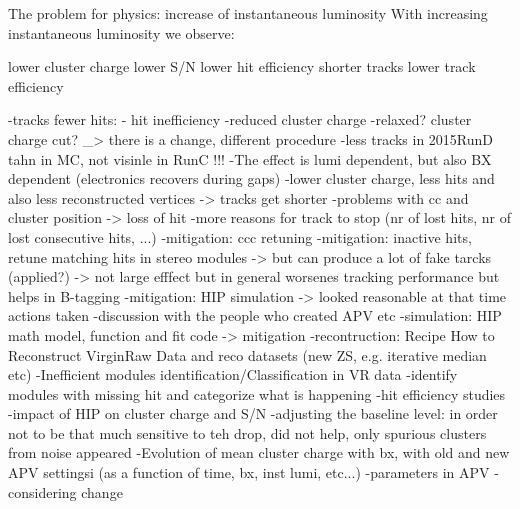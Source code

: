 The problem for physics:
increase of instantaneous luminosity
 With increasing instantaneous luminosity we observe:

    lower cluster charge
    lower S/N
    lower hit efficiency
    shorter tracks
    lower track efficiency 

-tracks fewer hits:
- hit inefficiency
-reduced cluster charge
-relaxed? cluster charge cut? _> there is a change, different procedure
-less tracks in  2015RunD tahn in MC, not visinle in RunC  !!!
-The effect is lumi dependent, but also BX dependent (electronics recovers during gaps)
-lower cluster charge, less hits and also less reconstructed vertices -> tracks get shorter
-problems with cc and cluster position -> loss of hit
-more reasons for track to stop (nr of lost hits, nr of lost consecutive hits, ...)
-mitigation: ccc retuning
-mitigation: inactive hits, retune matching hits in stereo modules -> but can produce a lot of fake tarcks (applied?) -> not large efffect but in general worsenes tracking performance but helps in B-tagging
-mitigation: HIP simulation -> looked reasonable at that time
actions taken
-discussion with the people who created APV etc
-simulation: HIP math model, function and fit code -> mitigation
-recontruction: Recipe How to Reconstruct VirginRaw Data and reco datasets (new ZS, e.g. iterative median etc)
-Inefficient modules identification/Classification in VR data -identify modules with missing hit and categorize what is happening
-hit efficiency studies
-impact of HIP on cluster charge and S/N 
-adjusting the baseline level: in order not to be that much sensitive to teh drop, did not help, only spurious clusters from noise appeared
-Evolution of mean cluster charge with bx, with old and new APV settingsi (as a function of time, bx, inst lumi, etc...)
-parameters in APV - considering change

